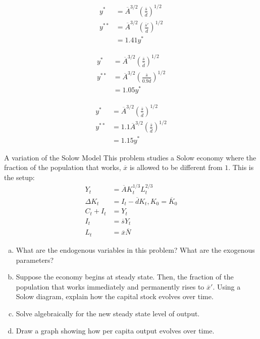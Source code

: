\documentclass[8pt]{extarticle}
\begin{document}
\begin{solution}
  \begin{tcolorbox}[title = (a), colback = white, breakable]
    \begin{align*}
      y^{*} &= \overline{A}^{3/2}\left(\frac{\overline{s}}{\overline{d}}\right)^{1/2}\\
      y^{**} &= \overline{A}^{3/2}\left(\frac{\overline{s}'}{\overline{d}}\right)^{1/2}\\
             &= 1.41y^{*}
    \end{align*}
  \end{tcolorbox}
  \begin{tcolorbox}[colback = white, title = (b)]
    \begin{align*}
      y^{*} &= \overline{A}^{3/2}\left(\frac{\overline{s}}{\overline{d}}\right)^{1/2}\\
      y^{**} &= \overline{A}^{3/2}\left(\frac{\overline{s}}{0.9\overline{d}}\right)^{1/2}\\
           &= 1.05 y^*
    \end{align*}
  \end{tcolorbox}
  \begin{tcolorbox}[colback = white, title = (c)]
    \begin{align*}
      y^{*} &= \overline{A}^{3/2}\left(\frac{\overline{s}}{\overline{d}}\right)^{1/2}\\
      y^{**} &= 1.1\overline{A}^{3/2}\left(\frac{\overline{s}}{\overline{d}}\right)^{1/2}\\
             &= 1.15y^*
    \end{align*}
  \end{tcolorbox}
\end{solution}
\begin{problem}{A variation of the Solow Model}
  This problem studies a Solow economy where the fraction of the population that works, $\overline{x}$ is allowed to be different from $1$. This is the setup:
  \begin{align*}
    Y_t &= \overline{A}K_t^{1/3}L_t^{2/3}\\
    \Delta K_t &= I_t - \overline{d}K_t, K_0 = \overline{K}_0\\
    C_t + I_t &= Y_t \\
    I_t &= \overline{s}Y_t \\
    L_t &= \overline{x}\overline{N}
  \end{align*}
  \begin{enumerate}[(a)]
    \item What are the endogenous variables in this problem? What are the exogenous parameters?
    \item Suppose the economy begins at steady state. Then, the fraction of the population that works immediately and permanently rises to $\overline{x}'$. Using a Solow diagram, explain how the capital stock evolves over time.
    \item Solve algebraically for the new steady state level of output.
    \item Draw a graph showing how per capita output evolves over time.
  \end{enumerate}
\end{problem}
\end{document}
